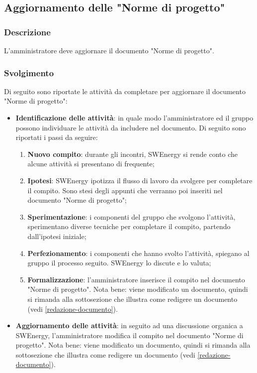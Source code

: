 \subsection{Aggiornamento delle "Norme di progetto"}
\label{aggiornare-ndp}

\subsubsection{Descrizione}

L'amministratore deve aggiornare il documento "Norme di progetto".

\subsubsection{Svolgimento}
Di seguito sono riportate le attività da completare per aggiornare il documento
"Norme di progetto":
\begin{itemize}
	\item \textbf{Identificazione delle attività}: in quale modo
	      l'amministratore ed il gruppo possono individuare le attività da
	      includere nel documento. Di seguito sono riportati i passi da
	      seguire:
	      \begin{enumerate}
		      \item \textbf{Nuovo compito}: durante gli incontri,
		            SWEnergy si rende conto che alcune attività si
		            presentano di frequente;

		      \item \textbf{Ipotesi}: SWEnergy ipotizza il flusso di lavoro da
		            svolgere per completare il compito. Sono stesi degli appunti
		            che verranno poi inseriti nel documento "Norme di progetto";

		      \item \textbf{Sperimentazione}: i componenti del gruppo che
		            svolgono l'attività, sperimentano diverse tecniche per
		            completare il compito, partendo dall'ipotesi iniziale;

		      \item \textbf{Perfezionamento}: i componenti che hanno
		            svolto l'attività, spiegano al gruppo il processo
		            seguito. SWEnergy lo discute e lo valuta;

		      \item \textbf{Formalizzazione}: l'amministratore inserisce il
		            compito nel documento "Norme di progetto". Nota bene:
		            viene modificato un documento, quindi si rimanda alla
		            sottosezione che illustra come redigere un documento
		            (vedi \autoref{redazione-documento}).
	      \end{enumerate}

	\item \textbf{Aggiornamento delle attività}: in seguito ad una discussione
	      organica a SWEnergy, l'amministratore modifica il
	      compito nel documento "Norme di progetto". Nota bene:
	      viene modificato un documento, quindi si rimanda alla
	      sottosezione che illustra come redigere un documento
	      (vedi \autoref{redazione-documento}).
\end{itemize}

